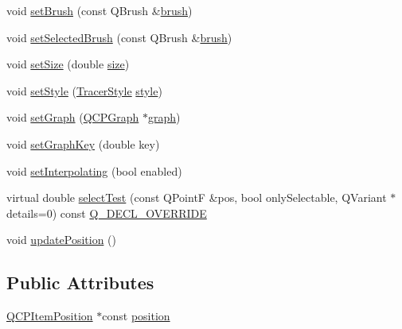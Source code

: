 \begin{DoxyCompactItemize}
\item 
void \mbox{\hyperlink{class_q_c_p_item_tracer_a2c303f7470a30084daa201ed556b3c36}{set\+Brush}} (const Q\+Brush \&\mbox{\hyperlink{class_q_c_p_item_tracer_a6dd4660e70f58bb00390bcda56be568d}{brush}})
\item 
void \mbox{\hyperlink{class_q_c_p_item_tracer_a0f55c084980a7a312af859d3e7b558ef}{set\+Selected\+Brush}} (const Q\+Brush \&\mbox{\hyperlink{class_q_c_p_item_tracer_a6dd4660e70f58bb00390bcda56be568d}{brush}})
\item 
void \mbox{\hyperlink{class_q_c_p_item_tracer_ae47fe0617f5fef5fdb766999569be10a}{set\+Size}} (double \mbox{\hyperlink{class_q_c_p_item_tracer_a4e42d7b49f293273a74a49a2457856e2}{size}})
\item 
void \mbox{\hyperlink{class_q_c_p_item_tracer_a41a2ac4f1acd7897b4e2a2579c03204e}{set\+Style}} (\mbox{\hyperlink{class_q_c_p_item_tracer_a2f05ddb13978036f902ca3ab47076500}{Tracer\+Style}} \mbox{\hyperlink{class_q_c_p_item_tracer_afdaee32c9ccc9c14502b28d3d86bf5ed}{style}})
\item 
void \mbox{\hyperlink{class_q_c_p_item_tracer_af5886f4ded8dd68cb4f3388f390790c0}{set\+Graph}} (\mbox{\hyperlink{class_q_c_p_graph}{Q\+C\+P\+Graph}} $\ast$\mbox{\hyperlink{class_q_c_p_item_tracer_ac6526e3e1fff79894f034823461b138a}{graph}})
\item 
void \mbox{\hyperlink{class_q_c_p_item_tracer_a6840143b42f3b685cedf7c6d83a704c8}{set\+Graph\+Key}} (double key)
\item 
void \mbox{\hyperlink{class_q_c_p_item_tracer_a6c244a9d1175bef12b50afafd4f5fcd2}{set\+Interpolating}} (bool enabled)
\item 
virtual double \mbox{\hyperlink{class_q_c_p_item_tracer_a9fd955fea40e977d66f3a9fd5765aec4}{select\+Test}} (const Q\+PointF \&pos, bool only\+Selectable, Q\+Variant $\ast$details=0) const \mbox{\hyperlink{qcustomplot_8h_a42cc5eaeb25b85f8b52d2a4b94c56f55}{Q\+\_\+\+D\+E\+C\+L\+\_\+\+O\+V\+E\+R\+R\+I\+DE}}
\item 
void \mbox{\hyperlink{class_q_c_p_item_tracer_a5b90296109e36384aedbc8908a670413}{update\+Position}} ()
\end{DoxyCompactItemize}
\subsection*{Public Attributes}
\begin{DoxyCompactItemize}
\item 
\mbox{\hyperlink{class_q_c_p_item_position}{Q\+C\+P\+Item\+Position}} $\ast$const \mbox{\hyperlink{class_q_c_p_item_tracer_a69917e2fdb2b3a929c196958feee7cbe}{position}}
\end{DoxyCompactItemize}
